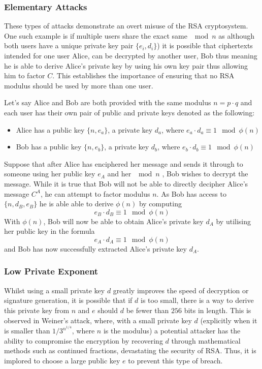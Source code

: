 \documentclass{article}
\begin{document}
\subsubsection{Elementary Attacks}
These types of attacks demonstrate an overt misuse of the RSA cryptosystem. One such example is if multiple users share the exact same $\mod n$ as although both users have a unique private key pair $\{e_i, d_i\}$) it is possible that ciphertexts intended for one user Alice, can be decrypted by another user, Bob thus meaning he is able to derive Alice's private key by using his own key pair thus allowing him to factor $C$. This establishes the importance of ensuring that no RSA modulus should be used by more than one user. 

Let's say Alice and Bob are both provided with the same modulus $n = p\cdot q$ and each user has their own pair of public and private keys denoted as the following: 
\begin{itemize}
    \item Alice has a public key $\{n, e_a\}$, a private key $d_a$, where $e_a \cdot d_a \equiv 1 \mod \phi(n)$
    \item   Bob has a public key $\{n, e_b\}$, a private key $d_b$, where $e_b \cdot d_b \equiv 1 \mod \phi(n)$
\end{itemize}
Suppose that after Alice has enciphered her message and sends it through to someone using her public key $e_A$ and her $\mod n$ , Bob wishes to decrypt the message. While it is true that Bob will not be able to directly decipher Alice's message $C^A$, he can attempt to factor modulus $n$. As Bob has access to $\{n, d_B, e_B\}$ he is able able to derive $\phi(n)$ by computing
\begin{equation}
    e_B \cdot d_B \equiv 1 \mod \phi(n)
\end{equation}
With $\phi(n)$, Bob will now be able to obtain Alice's private key $d_A$ by utilising her public key in the formula
\begin{equation}
    e_A \cdot d_A \equiv 1 \mod \phi(n)
\end{equation}
and Bob has now successfully extracted Alice's private key $d_A$. 

\subsubsection{Low Private Exponent}
Whilst using a small private key $d$ greatly improves the speed of decryption or signature generation, it is possible that if $d$ is too small, there is a way to derive this private key from $n$ and $e$ should $d$ be fewer than $256$ bits in length. This is observed in Weiner's \cite{attacks} attack, where, with a small private key $d$ (explicitly when it is smaller than $1/3^{n^{1/4}}$, where $n$ is the modulus) a potential attacker has the ability to compromise the encryption by recovering $d$ through mathematical methods such as continued fractions, devastating the security of RSA. Thus, it is implored to choose a large public key $e$ to prevent this type of breach.
\end{document}
